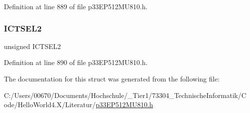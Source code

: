 Definition at line 889 of file p33\+E\+P512\+M\+U810.\+h.

\mbox{\label{structtag_i_c7_c_o_n1_b_i_t_s_a47d80892d449e6edbd5ba2ba9ff06deb}} 
\subsubsection{\texorpdfstring{I\+C\+T\+S\+E\+L2}{ICTSEL2}}
{\footnotesize\ttfamily unsigned I\+C\+T\+S\+E\+L2}



Definition at line 890 of file p33\+E\+P512\+M\+U810.\+h.



The documentation for this struct was generated from the following file\+:\begin{DoxyCompactItemize}
\item 
C\+:/\+Users/00670/\+Documents/\+Hochschule/\+\_\+\+Tier1/73304\+\_\+\+Technische\+Informatik/\+Code/\+Hello\+World4.\+X/\+Literatur/\hyperlink{p33_e_p512_m_u810_8h}{p33\+E\+P512\+M\+U810.\+h}\end{DoxyCompactItemize}
